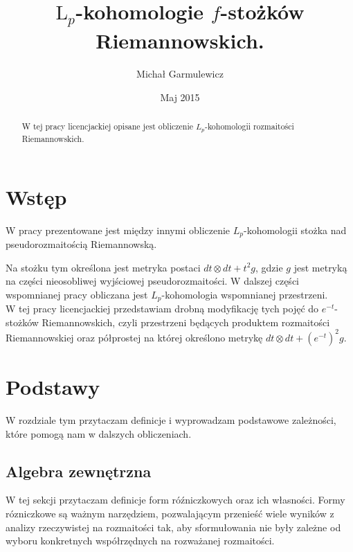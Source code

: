 \documentclass[licencjacka]{pracamgr}
\author{Michał Garmulewicz}
\title{$\mathrm{L}_p$-kohomologie $f$-stożków Riemannowskich.}
\date{Maj 2015}
\theoremstyle{definition}
\theoremstyle{definition}
\theoremstyle{plain}
\theoremstyle{plain}
\theoremstyle{plain}
\theoremstyle{plain}
\begin{document}
\maketitle

\begin{abstract}
  W tej pracy licencjackiej opisane jest obliczenie $L_p$-kohomologii
  rozmaitości Riemannowskich.
\end{abstract}

\tableofcontents

\chapter{Wstęp}

W pracy \cite{weber} prezentowane jest między innymi obliczenie
$L_p$-kohomologii stożka nad pseudorozmaitością Riemannowską. 

Na stożku tym określona jest metryka postaci
$dt \otimes dt + t^2 g$, gdzie $g$ 
jest metryką na części nieosobliwej wyjściowej pseudorozmaitości.
W dalszej części wspomnianej pracy obliczana jest $L_p$-kohomologia
wspomnianej przestrzeni.
\\


W tej pracy licencjackiej przedstawiam drobną modyfikację tych pojęć do
$e^{-t}$-stożków Riemannowskich, czyli przestrzeni będących produktem
rozmaitości Riemannowskiej oraz półprostej na której określono metrykę
$dt \otimes dt + (e^{-t})^2 g$. \\


\chapter{Podstawy}
W rozdziale tym przytaczam definicje i wyprowadzam podstawowe zależności, które
pomogą nam w dalszych obliczeniach. \\


\section{Algebra zewnętrzna}
W tej sekcji przytaczam definicje form róźniczkowych oraz ich własności. Formy
rózniczkowe są ważnym narzędziem, pozwalającym przenieść wiele wyników z
analizy rzeczywistej na rozmaitości tak, aby sformułowania nie były zależne od
wyboru konkretnych współrzędnych na rozważanej rozmaitości. \\
\end{document}
